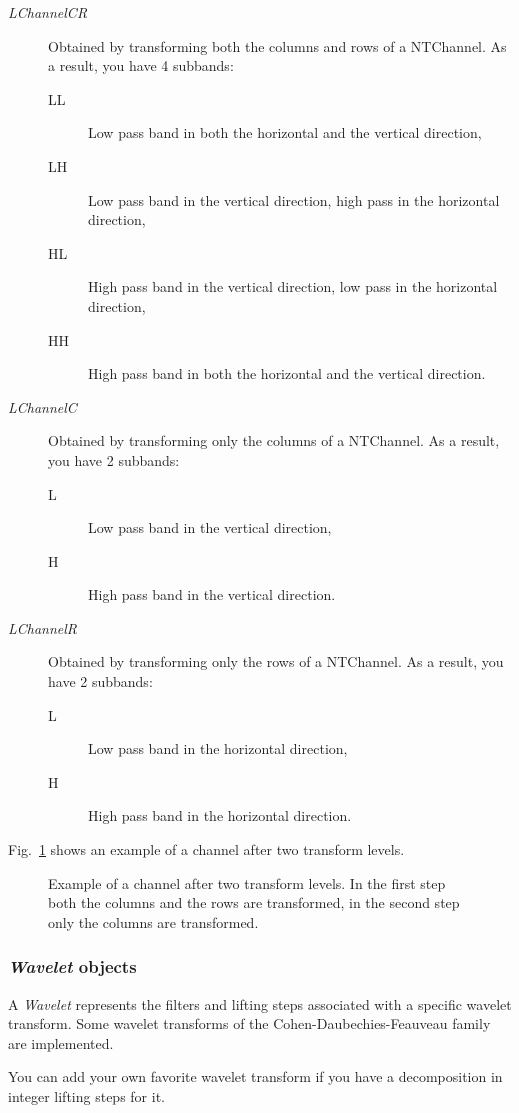 \begin{description}
\item[\emph{LChannelCR}] Obtained by transforming both the columns and
rows of a NTChannel. As a result, you have 4 subbands:
\begin{description}
\item[LL] Low pass band in both the horizontal and the vertical direction,
\item[LH] Low pass band in the vertical direction, high pass in the horizontal
	  direction,
\item[HL] High pass band in the vertical direction, low pass in the horizontal
	  direction,
\item[HH] High pass band in both the horizontal and the vertical direction.
\end{description}

\item[\emph{LChannelC}] Obtained by transforming only the columns of a
NTChannel. As a result, you have 2 subbands:
\begin{description}
\item[L] Low pass band in the vertical direction,
\item[H] High pass band in the vertical direction.
\end{description}

\item[\emph{LChannelR}] Obtained by transforming only the rows of a
NTChannel. As a result, you have 2 subbands:
\begin{description}
\item[L] Low pass band in the horizontal direction,
\item[H] High pass band in the horizontal direction.
\end{description}
\end{description}

Fig.~\ref{fig:eg_transform} shows an example of a channel after two transform
levels.

\begin{figure}\begin{center}
\caption{Example of a channel after two transform levels. In the first step
both the columns and the rows are transformed, in the second step only the
columns are transformed.}
\label{fig:eg_transform}
\end{center}\end{figure}


\subsubsection{\emph{Wavelet} objects}

A \emph{Wavelet} represents the filters and lifting steps associated with a
specific wavelet transform. Some wavelet transforms of the
Cohen-Daubechies-Feauveau family are implemented.

You can add your own favorite wavelet transform if you have a decomposition in
integer lifting steps for it.

